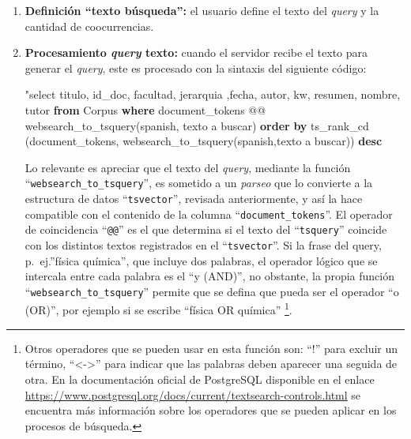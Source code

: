 \documentclass[
  12pt,
  openany]{book}
\newenvironment{Shaded}{\begin{snugshade}}{\end{snugshade}}
\newcommand{\KeywordTok}[1]{\textcolor[rgb]{0.13,0.29,0.53}{\textbf{#1}}}
\newcommand{\NormalTok}[1]{#1}
\newcommand{\OtherTok}[1]{\textcolor[rgb]{0.56,0.35,0.01}{#1}}
\newcommand{\StringTok}[1]{\textcolor[rgb]{0.31,0.60,0.02}{#1}}
\begin{document}
\begin{enumerate}
\def\labelenumi{\arabic{enumi}.}
\item
  \textbf{Definición ``texto búsqueda'':} el usuario define el texto del \emph{query} y la cantidad de coocurrencias.
\item
  \textbf{Procesamiento \emph{query} texto:} cuando el servidor recibe el texto para generar el \emph{query}, este es procesado con la sintaxis del siguiente código:

\begin{Shaded}
\begin{Highlighting}[]
\OtherTok{"select titulo, id\_doc, facultad, jerarquia ,fecha,}
\NormalTok{  autor, kw, resumen, nombre, tutor }\KeywordTok{from}\NormalTok{ Corpus }\KeywordTok{where}
\NormalTok{  document\_tokens @@ websearch\_to\_tsquery(}\StringTok{\textquotesingle{}spanish\textquotesingle{}}\NormalTok{,}
    \StringTok{\textquotesingle{}texto a buscar\textquotesingle{}}\NormalTok{) }
  \KeywordTok{order} \KeywordTok{by}\NormalTok{ ts\_rank\_cd (document\_tokens,}
\NormalTok{    websearch\_to\_tsquery(}\StringTok{\textquotesingle{}spanish\textquotesingle{}}\NormalTok{,}\StringTok{\textquotesingle{}texto a buscar\textquotesingle{}}\NormalTok{)) }\KeywordTok{desc}
\end{Highlighting}
\end{Shaded}

  Lo relevante es apreciar que el texto del \emph{query}, mediante la función ``\texttt{websearch\_to\_tsquery}'', es sometido a un \emph{parseo} que lo convierte a la estructura de datos ``\texttt{tsvector}'', revisada anteriormente, y así la hace compatible con el contenido de la columna ``\texttt{document\_tokens}''. El operador de coincidencia ``\texttt{@@}'' es el que determina si el texto del ``\texttt{tsquery}'' coincide con los distintos textos registrados en el ``\texttt{tsvector}''. Si la frase del query, p.~ej.''física química'', que incluye dos palabras, el operador lógico que se intercala entre cada palabra es el ``y (AND)'', no obstante, la propia función ``\texttt{websearch\_to\_tsquery}'' permite que se defina que pueda ser el operador ``o (OR)'', por ejemplo si se escribe ``física OR química'' \footnote{Otros operadores que se pueden usar en esta función son: ``!'' para excluir un término, ``\textless-\textgreater{}'' para indicar que las palabras deben aparecer una seguida de otra. En la documentación oficial de PostgreSQL disponible en el enlace \url{https://www.postgresql.org/docs/current/textsearch-controls.html} se encuentra más información sobre los operadores que se pueden aplicar en los procesos de búsqueda.}.


\end{enumerate}
\end{document}
